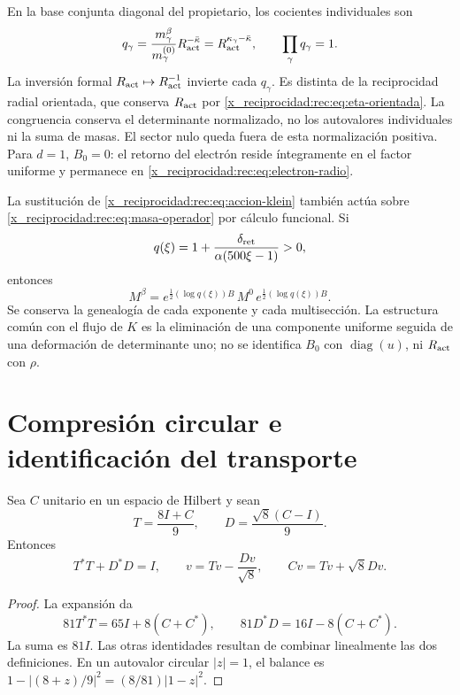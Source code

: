 En la base conjunta diagonal del propietario, los cocientes individuales son
\[
 q_\gamma=\frac{m_\gamma^\beta}{m_\gamma^{(0)}}R_{\rm act}^{-\bar\kappa}
 =R_{\rm act}^{\kappa_\gamma-\bar\kappa},\qquad
 \prod_\gamma q_\gamma=1.
\]
La inversión formal \(R_{\rm act}\mapsto R_{\rm act}^{-1}\) invierte cada \(q_\gamma\). Es distinta de la reciprocidad radial orientada, que conserva \(R_{\rm act}\) por \eqref{x_reciprocidad:rec:eq:eta-orientada}. La congruencia conserva el determinante normalizado, no los autovalores individuales ni la suma de masas. El sector nulo queda fuera de esta normalización positiva. Para \(d=1\), \(B_0=0\): el retorno del electrón reside íntegramente en el factor uniforme y permanece en \eqref{x_reciprocidad:rec:eq:electron-radio}.

La sustitución de \eqref{x_reciprocidad:rec:eq:accion-klein} también actúa sobre \eqref{x_reciprocidad:rec:eq:masa-operador} por cálculo funcional. Si
\[
 q(\xi)=1+\frac{\delta_{\rm ret}}{\alpha(500\xi-1)}>0,
\]
entonces
\[
 M^\beta=e^{\frac12(\log q(\xi))B}\,M^0\,
          e^{\frac12(\log q(\xi))B}.
\]
Se conserva la genealogía de cada exponente y cada multisección. La estructura común con el flujo de \(K\) es la eliminación de una componente uniforme seguida de una deformación de determinante uno; no se identifica \(B_0\) con \(\operatorname{diag}(u)\), ni \(R_{\rm act}\) con \(\rho\).

\section{Compresión circular e identificación del transporte}

\begin{theorem}
\label{x_reciprocidad:rec:thm:operador}
Sea \(C\) unitario en un espacio de Hilbert y sean
\[
 T=\frac{8I+C}{9},\qquad D=\frac{\sqrt8(C-I)}9.
\]
Entonces
\begin{equation}
 T^*T+D^*D=I,\qquad
 v=Tv-\frac{Dv}{\sqrt8},\qquad Cv=Tv+\sqrt8Dv.
 \label{x_reciprocidad:rec:eq:unitario}
\end{equation}
\end{theorem}
\begin{proof}
La expansión da
\[
 81T^*T=65I+8(C+C^*),\qquad
 81D^*D=16I-8(C+C^*).
\]
La suma es \(81I\). Las otras identidades resultan de combinar linealmente las dos definiciones. En un autovalor circular \(|z|=1\), el balance es
\(1-|(8+z)/9|^2=(8/81)|1-z|^2\).
\end{proof}

